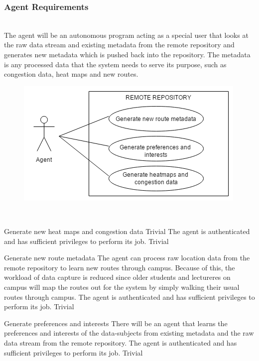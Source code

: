 \subsubsection{Agent Requirements}\mbox{}\\
The agent will be an autonomous program acting as a special user that looks at the raw data stream and existing metadata from the remote repository and generates new metadata which is pushed back into the repository. The metadata is any processed data that the system needs to serve its purpose, such as congestion data, heat maps and new routes.
\begin{figure}[h] 
  \includegraphics[width=\textwidth]{diagrams/Specific_Requirements/Agent_Use_Case.png}
\end{figure}
\\
\bigskip

\FuncReq
{Generate new heat maps and congestion data}
{Trivial}
{The agent is authenticated and has sufficient privileges to perform its job.}
{Trivial}

\FuncReq
{Generate new route metadata}
{The agent can process raw location data from the remote repository to learn new routes through campus. Because of this, the workload of data capture is reduced since older students and lectureres on campus will map the routes out for the system by simply walking their usual routes through campus.}
{The agent is authenticated and has sufficient privileges to perform its job.}
{Trivial}

\FuncReq
{Generate preferences and interests}
{There will be an agent that learns the preferences and interests of the data-subjects from existing metadata and the raw data stream from the remote repository.}
{The agent is authenticated and has sufficient privileges to perform its job.}
{Trivial}
 
